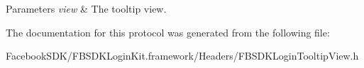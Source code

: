 \begin{DoxyParams}{Parameters}
{\em view} & The tooltip view. \\
\hline
\end{DoxyParams}


The documentation for this protocol was generated from the following file\-:\begin{DoxyCompactItemize}
\item 
Facebook\-S\-D\-K/\-F\-B\-S\-D\-K\-Login\-Kit.\-framework/\-Headers/F\-B\-S\-D\-K\-Login\-Tooltip\-View.\-h\end{DoxyCompactItemize}
